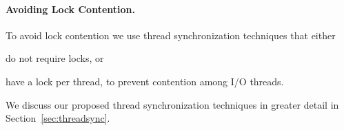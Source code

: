 \paragraph{Avoiding Lock Contention.}
To avoid lock contention we use thread synchronization techniques that either
\begin{enumerate*}[label={(\roman*)}]
  \item do not require locks, or
  \item have a lock per thread, to prevent contention among I/O threads.
\end{enumerate*}
We discuss our proposed thread synchronization techniques in greater detail in
Section~\ref{sec:threadsync}.
